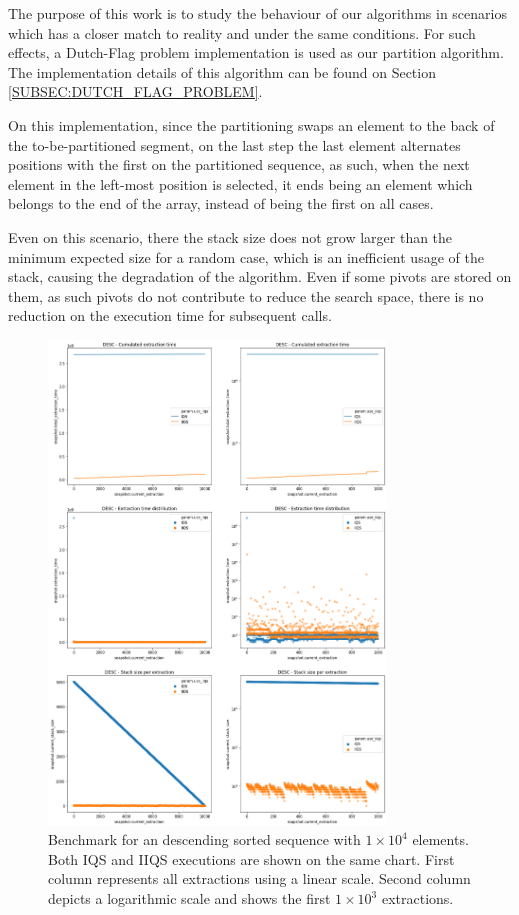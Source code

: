The purpose of this work is to study the behaviour of our algorithms in scenarios which has a closer match to reality and under the same conditions. For such effects, a Dutch-Flag problem implementation is used as our partition algorithm. The implementation details of this algorithm can be found on Section \ref{SUBSEC:DUTCH_FLAG_PROBLEM}.

On this implementation, since the partitioning swaps an element to the back of the to-be-partitioned segment, on the last step the last element alternates positions with the first on the partitioned sequence, as such, when the next element in the left-most position is selected, it ends being an element which belongs to the end of the array, instead of being the first on all cases.

Even on this scenario, there the stack size does not grow larger than the minimum expected size for a random case, which is an inefficient usage of the stack, causing the degradation of the algorithm. Even if some pivots are stored on them, as such pivots do not contribute to reduce the search space, there is no reduction on the execution time for subsequent calls.

\begin{figure}[!ht]
    \centering
    \includegraphics[width=0.8\textwidth]{./fragments/04_experimental_execution/images/01_basebenchmark_03_sort_d_case.png}
    \caption{Benchmark for an descending sorted sequence with $1\times10^4$ elements. Both IQS and IIQS executions are shown on the same chart. First column represents all extractions using a linear scale. Second column depicts a logarithmic scale and shows the first $1\times10^3$ extractions.}
    \label{FIG:BENCHMARK_03_DESC_CASE}
\end{figure}

